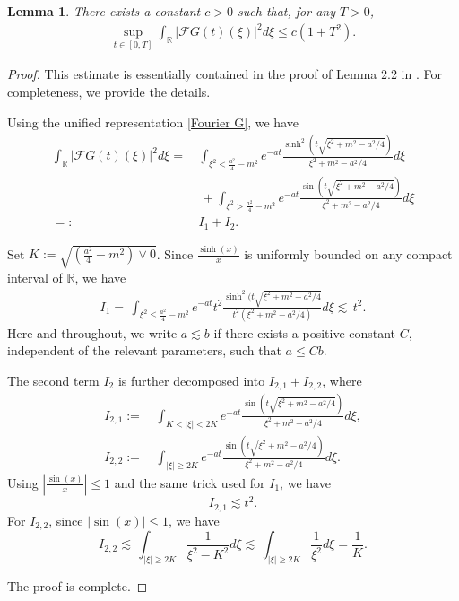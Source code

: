 \documentclass[11pt,reqno]{amsart}
\numberwithin{equation}{section}
\newtheorem{lemma}{Lemma}[section]
\newcommand{\1}{{\bf 1}}
\newcommand{\2}{{\bf 2}}
\begin{document}
 \begin{lemma}\label{lem G1}There exists a constant $c>0$ such that,  for any $T>0$, 
  \begin{align}\label{eq G110}
  \sup_{t\in [0,T]}\int_{\mathbb R}|\mathscr F G(t)(\xi)|^2d\xi\le c\left(1+T^2\right).
  \end{align}
  \end{lemma}
  \begin{proof}  
  This estimate  is essentially contained in the proof of Lemma 2.2 in \cite{CL25}. For completeness, we  provide the details.
  
    Using the unified representation  \eqref{Fourier G}, we have 
  \begin{align*}
  \int_{\mathbb R}|\mathscr  F G(t)(\xi)|^2d\xi= &\,  \int_{\xi^2<\frac{a^2}{4}-m^2} e^{-a t}\frac{\sinh^2\left(t\sqrt{\xi^2+m^2-a^2/4}\right)}{\xi^2+m^2-a^2/4} d\xi\\ 
  &\,\, + \int_{\xi^2>\frac{a^2}{4}-m^2} e^{-at}\frac{\sin\left(t \sqrt{\xi^2+m^2-a^2/4}\right)}{\xi^2+m^2-a^2/4} d\xi\\
   =:  &\, I_1+I_2.
  \end{align*}
  
  Set $K:=\sqrt{\left(\frac{a^2}{4}-m^2\right)\vee 0}$. 
  Since $\frac{\sinh(x)}{x}$ is uniformly bounded on any compact interval of $\mathbb R$, we have 
  \begin{align*}
  I_1= \,  \int_{\xi^2\le \frac{a^2}{4}-m^2} e^{-at} t^2\frac{\sinh^2(t\sqrt{\xi^2+m^2-a^2/4}}{t^2(\xi^2+m^2-a^2/4)} d\xi 
 \lesssim   \,      t^2. 
  \end{align*} 
  Here and throughout, we write $a\lesssim b$  if there exists a positive constant $C$, independent of the relevant parameters, such that $a\le C b$.
 
 The second term $I_2$  is further decomposed  into $I_{2,1}+I_{2,2}$, where 
  \begin{align*}
  I_{2,1}:=&\,   \int_{ K<|\xi| <2K} e^{-at}\frac{\sin\left(t \sqrt{\xi^2+m^2-a^2/4}\right)}{\xi^2+m^2-a^2/4} d\xi,\\
   I_{2,2}:=&\,   \int_{|\xi| \ge 2K} e^{-at}\frac{\sin\left(t \sqrt{\xi^2+m^2-a^2/4}\right)}{\xi^2+m^2-a^2/4} d\xi.
  \end{align*}
     Using $\left| \frac{\sin(x)}{x}\right|\le 1$ and the same trick used for $I_1$, we have
  $$
  I_{2,1}\lesssim  t^2. 
  $$
  For $I_{2,2}$,  since $|\sin(x)|\le 1$, we have 
  $$
  I_{2,2}\lesssim  \,  \int_{|\xi| \ge 2K} \frac{1}{\xi^2-K^2} d\xi 
 \lesssim    \,     \int_{|\xi| \ge 2K} \frac{1}{\xi^2 } d\xi =\frac{1}{K}. 
  $$
  
  The proof is complete. 
  \end{proof}
  
\end{document}
